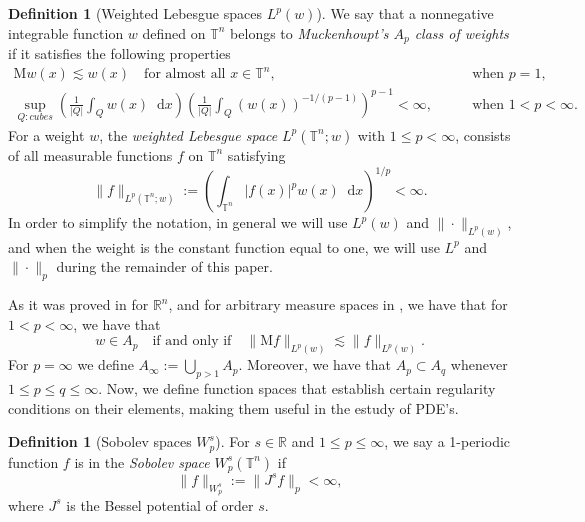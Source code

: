 \documentclass[12pt, reqno]{amsart}
\theoremstyle{definition}
\newtheorem{definition}[theorem]{Definition}
\theoremstyle{remark}
\numberwithin{equation}{section}
\newcommand*\diff{\mathop{}\!\mathrm{d}}
\begin{document}
\begin{definition}[Weighted Lebesgue spaces $L^p(w)$]
We say that a nonnegative integrable function $w$ defined on $\mathbb{T}^n$ belongs to \textit{Muckenhoupt's $A_p$ class of weights} if it satisfies the following properties
\begin{align*}
    \mathrm{M}w(x) \lesssim w(x) \quad \text{for almost all }x\in\mathbb{T}^n, & \quad \quad \text{when } p=1, \\
    \sup_{Q:cubes} \left(
    \frac{1}{|Q|} \int_Qw(x)\diff x
    \right) \left( 
    \frac{1}{|Q|} \int_Q (w(x))^{-1/(p-1)}
    \right)^{p-1} < \infty,
    & \quad \quad \text{when } 1<p<\infty.
\end{align*}
For a weight $w$, the \textit{weighted Lebesgue space} $L^p(\mathbb{T}^n; w)$ with $1\leq p<\infty$, consists of all measurable functions $f$ on $\mathbb{T}^n$ satisfying
\begin{equation*}
    \|f\|_{L^p(\mathbb{T}^n;w)} := \left( 
    \int_{\mathbb{T}^n} |f(x)|^pw(x)\diff x
    \right)^{1/p} < \infty.
\end{equation*}
In order to simplify the notation, in general we will use $L^p(w)$ and $\|\cdot\|_{L^p(w)}$, and when the weight is the constant function equal to one, we will use $L^p$ and $\|\cdot\|_p$ during the remainder of this paper.
\end{definition}
As it was proved in \cite{muckenhoupt} for $\mathbb{R}^n$, and for arbitrary measure spaces in \cite[Section~IV.1]{garcia-defrancia}, we have that for $1<p<\infty$, we have that 
\begin{equation}
    w \in A_p \quad \text{if and only if} \quad \|\mathrm{M}f\|_{L^p(w)} \lesssim\|f\|_{L^p(w)}.
    \label{eq:muckenhoupt}
\end{equation}
For $p=\infty$ we define $A_\infty := \bigcup_{p>1} A_p$. Moreover, we have that $A_p \subset A_q$ whenever $1\leq p \leq q \leq \infty$. Now, we define function spaces that establish certain regularity conditions on their elements, making them useful in the estudy of PDE's.
\begin{definition}[Sobolev spaces $W^s_p$]
    For $s\in\mathbb{R}$ and $1\leq p \leq \infty$, we say a 1-periodic function $f$ is in the \textit{Sobolev space} $W^s_p(\mathbb{T}^n)$ if 
    \begin{equation*}
        \|f\|_{W^s_p} := \|J^sf\|_p < \infty,
    \end{equation*}
    where $J^s$ is the Bessel potential of order $s$.
\end{definition}
\end{document}
